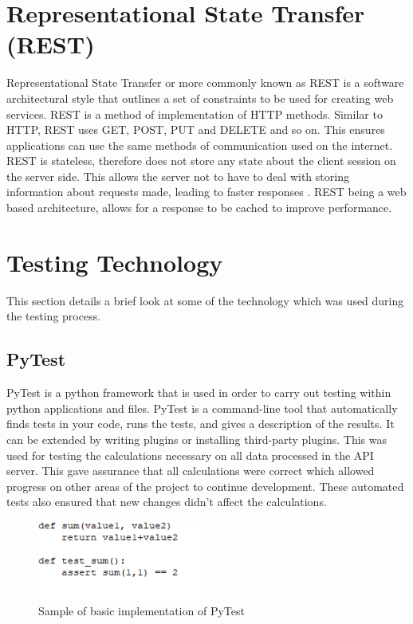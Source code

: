 \section{Representational State Transfer (REST)}
Representational State Transfer or more commonly known as REST is a software architectural style that outlines a set of constraints to be used for creating web services. REST is a method of implementation of HTTP methods. Similar to HTTP, REST uses GET, POST, PUT and DELETE and so on. This ensures applications can use the same methods of communication used on the internet. REST is stateless, therefore does not store any state about the client session on the server side. This allows the server not to have to deal with storing information about requests made, leading to faster responses \cite{khare2004extending}. REST being a web based architecture, allows for a response to be cached to improve performance.

\section{Testing Technology}
This section details a brief look at some of the technology which was used during the testing process.

\subsection{PyTest}
PyTest is a python framework that is used in order to carry out testing within python applications and files. PyTest is a command-line tool that automatically finds tests in your code, runs the tests, and gives a description of the results.\cite{okken2017python} It can be extended by writing plugins or installing third-party plugins. This was used for testing the calculations necessary on all data processed in the API server. This gave assurance that all calculations were correct which allowed progress on other areas of the project to continue development. These automated tests also ensured that new changes didn’t affect the calculations.
\begin{figure}[h!]
 	\caption{Sample of basic implementation of PyTest}
	\label{image:pytestimpl}
 	\centering
 	\includegraphics[width=0.5\textwidth]{Images/pytestsample.PNG}
\end{figure}

